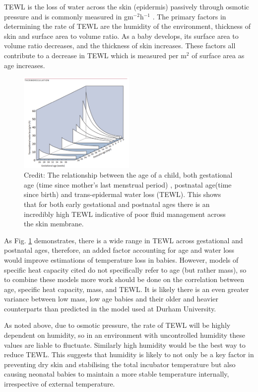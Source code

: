 \documentclass{article}
\begin{document}
\vspace{3mm}
TEWL is the loss of water across the skin (epidermis) passively through osmotic pressure and is commonly measured in gm$^{-2}$h$^{-1}$ \cite{BTT1}. The primary factors in determining the rate of TEWL are the humidity of the environment, thickness of skin and surface area to volume ratio. As a baby develops, its surface area to volume ratio decreases, and the thickness of skin increases. These factors all contribute to a decrease in TEWL which is measured per m$^{2}$ of surface area as age increases.  
\begin{figure}[H]
    \centering
    \captionsetup{justification=centering,margin=1cm}
    \includegraphics[width=0.5\textwidth]{3.png}
    \caption{Credit: \cite{BTT1} 
    The relationship between the age of a child, both gestational age (time since mother’s last menstrual period) , postnatal age(time since birth) and trans-epidermal water loss (TEWL).  This shows that for both early gestational and postnatal ages there is an incredibly high TEWL indicative of poor fluid management across the skin membrane.  }
    \label{TEWL}
\end{figure}


As Fig. \ref{TEWL} demonstrates, there is a wide range in TEWL across gestational and postnatal ages, therefore, an added factor accounting for age and water loss would improve estimations of temperature loss in babies. However, models of specific heat capacity cited do not specifically refer to age (but rather mass), so to combine these models more work should be done on the correlation between age, specific heat capacity, mass, and TEWL. It is likely there is an even greater variance between low mass, low age babies and their older and heavier counterparts than predicted in the model used at Durham University. 

\vspace{3mm}

As noted above, due to osmotic pressure, the rate of TEWL will be highly dependent on humidity, so in an environment with uncontrolled humidity these values are liable to fluctuate. Similarly high humidity would be the best way to reduce TEWL. This suggests that humidity is likely to not only be a key factor in preventing dry skin and stabilising the total incubator temperature but also causing neonatal babies to maintain a more stable temperature internally, irrespective of external temperature. 
\end{document}
